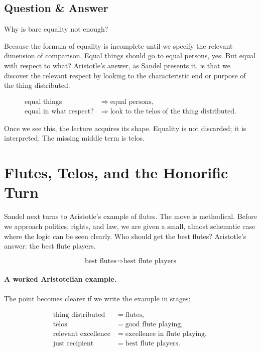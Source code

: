 \subsection{Question \& Answer}

Why is bare equality not enough?

Because the formula of equality is incomplete until we specify the relevant dimension of comparison. Equal things should go to equal persons, yes. But equal with respect to what? Aristotle's answer, as Sandel presents it, is that we discover the relevant respect by looking to the characteristic end or purpose of the thing distributed.

\begin{align}
\text{equal things} &\Longrightarrow \text{equal persons},\\
\text{equal in what respect?} &\Longrightarrow \text{look to the telos of the thing distributed}.
\end{align}

Once we see this, the lecture acquires its shape. Equality is not discarded; it is interpreted. The missing middle term is telos.

\section{Flutes, Telos, and the Honorific Turn}

Sandel next turns to Aristotle's example of flutes. The move is methodical. Before we approach politics, rights, and law, we are given a small, almost schematic case where the logic can be seen clearly. Who should get the best flutes? Aristotle's answer: the best flute players.

\begin{equation}
\text{best flutes} \Longrightarrow \text{best flute players}
\end{equation}

\paragraph{A worked Aristotelian example.}

The point becomes clearer if we write the example in stages:

\begin{align}
\text{thing distributed} &= \text{flutes},\\
\text{telos} &= \text{good flute playing},\\
\text{relevant excellence} &= \text{excellence in flute playing},\\
\text{just recipient} &= \text{best flute players}.
\end{align}

